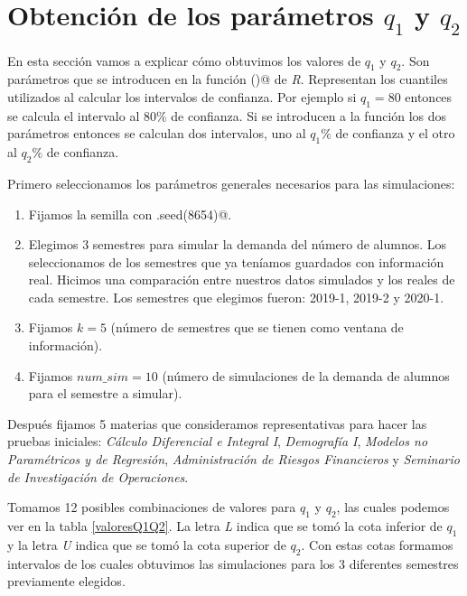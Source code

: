 \section{Obtención de los parámetros $q_{1}$ y $q_{2}$}

En esta sección vamos a explicar cómo obtuvimos los valores de $q_{1}$ y $q_{2}$. Son parámetros que se introducen en la función \verb@hw()@ de \textit{R}. Representan los cuantiles utilizados al calcular los intervalos de confianza. Por ejemplo si $q_{1} = 80$ entonces se calcula el intervalo al $80\%$ de confianza. Si se introducen a la función los dos parámetros entonces se calculan dos intervalos, uno al $q_{1}\%$ de confianza y el otro al $q_{2}\%$ de confianza.

Primero seleccionamos los parámetros generales necesarios para las simulaciones:

\begin{enumerate}
\item Fijamos la semilla con \verb@set.seed(8654)@.

\item Elegimos 3 semestres para simular la demanda del número de alumnos. Los seleccionamos de los semestres que ya teníamos guardados con información real. Hicimos una comparación entre nuestros datos simulados y los reales de cada semestre. Los semestres que elegimos fueron: 2019-1, 2019-2 y 2020-1.

\item Fijamos $k = 5$ (número de semestres que se tienen como ventana de información).

\item Fijamos $num\_sim = 10$ (número de simulaciones de la demanda de alumnos para el semestre a simular).
\end{enumerate}


Después fijamos 5 materias que consideramos representativas para hacer las pruebas iniciales: \textit{Cálculo Diferencial e Integral I}, \textit{Demografía I}, \textit{Modelos no Paramétricos y de Regresión}, \textit{Administración de Riesgos Financieros} y \textit{Seminario de Investigación de Operaciones}.

Tomamos 12 posibles combinaciones de valores para $q_{1}$ y $q_{2}$, las cuales podemos ver en la tabla \ref{valoresQ1Q2}. La letra \textit{L} indica que se tomó la cota inferior de $q_{1}$ y la letra \textit{U} indica que se tomó la cota superior de $q_{2}$. Con estas cotas formamos intervalos de los cuales obtuvimos las simulaciones para los 3 diferentes semestres previamente elegidos. %


